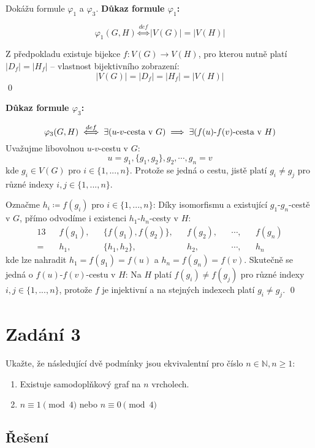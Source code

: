 \documentclass{article}
\begin{document}
Dokážu formule $\varphi_1$ a $\varphi_3$.
\textbf{Důkaz formule $\varphi_1$:}

\[
    \varphi_1(G, H) \overset{def}{\iff} \lvert V(G) \rvert = \lvert V(H) \rvert
\]

Z předpokladu existuje bijekce $f \colon V(G) \rightarrow V(H)$, pro kterou nutně platí $\lvert D_f \rvert = \lvert H_f \lvert$ -- vlastnost bijektivního zobrazení:
\[
    |V(G)| = |D_f| = |H_f| = |V(H)|
\]
\qed

\textbf{Důkaz formule $\varphi_3$:}

\[
    \varphi_3(G, H) \overset{def}{\iff} \exists (\text{$u$-$v$-cesta v $G$}) \implies \exists (\text{$f(u)$-$f(v)$-cesta v $H$}) \\
\]
Uvažujme libovolnou $u$-$v$-cestu v $G$:
\[u = g_1, \{g_1, g_2\}, g_2, \cdots, g_{n} = v \]
kde $g_i \in V(G)$ pro $i \in \{1, ..., n\}$. Protože se jedná o cestu, jistě platí $g_i \ne g_j$ pro různé indexy $i, j \in \{1, ..., n\}$.

Označme $h_i \coloneqq f(g_i)$ pro $i \in \{1, ..., n\}$: Díky isomorfismu a existující $g_1$-$g_n$-cestě v $G$, přímo odvodíme i existenci $h_1$-$h_n$-cesty v $H$:
\begin{alignat*}{13}
            & f(g_1), &  & \{f(g_1), f(g_2)\}, &  & f(g_2), &  & \cdots, &  & f(g_{n}) \\
    = \quad & h_1,    &  & \{h_1, h_2\},       &  & h_2,    &  & \cdots, &  & h_{n}
\end{alignat*}
kde lze nahradit $h_1 = f(g_1) = f(u)$ a $h_n = f(g_n) = f(v)$. Skutečně se jedná o $f(u)$-$f(v)$-cestu v $H$: Na $H$ platí $f(g_i) \ne f(g_j)$ pro různé indexy $i, j \in \{1, ..., n\}$, protože $f$ je injektivní a na stejných indexech platí $g_i \ne g_j$.
\qed

\newpage
\section*{Zadání 3}

Ukažte, že následující dvě podmínky jsou ekvivalentní pro číslo $n \in \mathbb{N}, n \ge 1$:
\begin{enumerate}
    \item Existuje samodoplňkový graf na $n$ vrcholech.
    \item $n \equiv 1 \pmod{4}$ nebo $n \equiv 0 \pmod{4}$
\end{enumerate}

\subsection*{Řešení}
\end{document}
